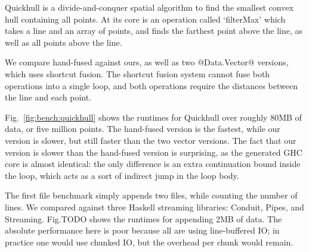 Quickhull is a divide-and-conquer spatial algorithm to find the smallest convex hull containing all points.
At its core is an operation called `filterMax' which takes a line and an array of points, and finds the farthest point above the line, as well as all points above the line.

We compare hand-fused against ours, as well as two @Data.Vector@ versions, which uses shortcut fusion.
The shortcut fusion system cannot fuse both operations into a single loop, and both operations require the distances between the line and each point.

Fig.~\ref{fig:bench:quickhull} shows the runtimes for Quickhull over roughly 80MB of data, or five million points.
The hand-fused version is the fastest, while our version is slower, but still faster than the two vector versions.
The fact that our version is slower than the hand-fused version is surprising, as the generated GHC core is almost identical: the only difference is an extra continuation bound inside the loop, which acts as a sort of indirect jump in the loop body.


The first file benchmark simply appends two files, while counting the number of lines.
We compared against three Haskell streaming libraries: Conduit, Pipes, and Streaming.
Fig.TODO 
shows the runtimes for appending 2MB of data.
The absolute performance here is poor because all are using line-buffered IO; in practice one would use chunked IO, but the overhead per chunk would remain.

